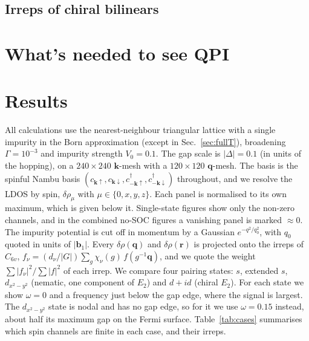 \documentclass[aps,prb,twocolumn,superscriptaddress,nofootinbib]{revtex4-2}
\newcommand{\bk}{\bm{k}}
\newcommand{\bq}{\bm{q}}
\newcommand{\br}{\bm{r}}
\begin{document}
\subsection{Irreps of chiral bilinears}

\section{What's needed to see QPI}

\section{Results}

All calculations use the nearest-neighbour triangular lattice with a single impurity in the Born approximation (except in Sec.~\ref{sec:fullT}), broadening $\Gamma = 10^{-3}$ and impurity strength $V_0 = 0.1$.
The gap scale is $|\Delta| = 0.1$ (in units of the hopping), on a $240 \times 240$ $\bk$-mesh with a $120 \times 120$ $\bq$-mesh.
The basis is the spinful Nambu basis $(c_{\bk\uparrow}, c_{\bk\downarrow}, c^\dagger_{-\bk\uparrow}, c^\dagger_{-\bk\downarrow})$ throughout, and we resolve the LDOS by spin, $\delta\rho_\mu$ with $\mu \in \{0, x, y, z\}$.
Each panel is normalised to its own maximum, which is given below it.
Single-state figures show only the non-zero channels, and in the combined no-SOC figures a vanishing panel is marked $\approx 0$.
The impurity potential is cut off in momentum by a Gaussian $e^{-q^2/q_0^2}$, with $q_0$ quoted in units of $|\bm b_1|$.
Every $\delta\rho(\bq)$ and $\delta\rho(\br)$ is projected onto the irreps of $C_{6v}$,
$f_\nu = (d_\nu/|G|) \sum_g \chi_\nu(g)\, f(g^{-1}\bq)$, and we quote the weight $\sum|f_\nu|^2 / \sum|f|^2$ of each irrep.
We compare four pairing states: $s$, extended $s$, $d_{x^2-y^2}$ (nematic, one component of $E_2$) and $d+id$ (chiral $E_2$).
For each state we show $\omega = 0$ and a frequency just below the gap edge, where the signal is largest.
The $d_{x^2-y^2}$ state is nodal and has no gap edge, so for it we use $\omega = 0.15$ instead, about half its maximum gap on the Fermi surface.
Table~\ref{tab:cases} summarises which spin channels are finite in each case, and their irreps.
\end{document}

